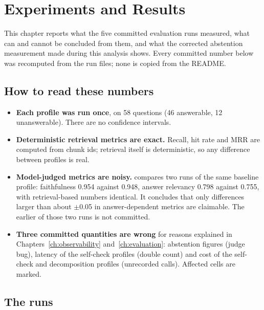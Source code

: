 \chapter{Experiments and Results}
\label{ch:results}

This chapter reports what the five committed evaluation runs measured, what can and cannot be concluded from them, and what the corrected abstention measurement made during this analysis shows. Every committed number below was recomputed from the run files; none is copied from the README.

\section{How to read these numbers}

\begin{itemize}
  \item \textbf{Each profile was run once}, on 58 questions (46 answerable, 12 unanswerable). There are no confidence intervals.
  \item \textbf{Deterministic retrieval metrics are exact.} Recall, hit rate and MRR are computed from chunk ids; retrieval itself is deterministic, so any difference between profiles is real.
  \item \textbf{Model-judged metrics are noisy.}  compares two runs of the same baseline profile: faithfulness 0.954 against 0.948, answer relevancy 0.798 against 0.755, with retrieval-based numbers identical. It concludes that only differences larger than about $\pm$0.05 in answer-dependent metrics are claimable. The earlier of those two runs is not committed.
  \item \textbf{Three committed quantities are wrong} for reasons explained in Chapters~\ref{ch:observability} and~\ref{ch:evaluation}: abstention figures (judge bug), latency of the self-check profiles (double count) and cost of the self-check and decomposition profiles (unrecorded calls). Affected cells are marked.
\end{itemize}

\section{The runs}

